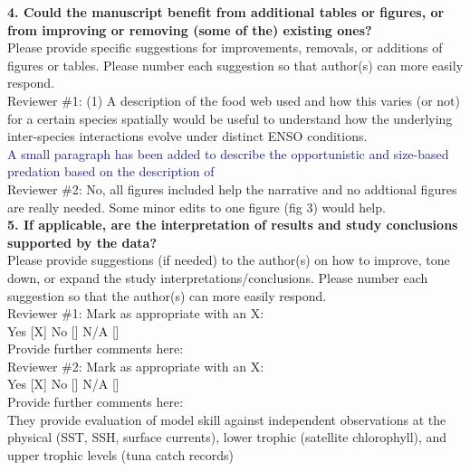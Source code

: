 \documentclass[12pt]{article}
\newcommand{\resp}[1]{\textcolor{MidnightBlue}{#1}}
\begin{document}
\textbf{4. Could the manuscript benefit from additional tables or figures, or from improving or removing (some of the) existing ones?} \\

Please provide specific suggestions for improvements, removals, or additions of figures or tables. Please number each suggestion so that author(s) can more easily respond.\\

Reviewer \#1: (1) A description of the food web used and how this varies (or not) for a certain species spatially would be useful to understand how the underlying inter-species interactions evolve under distinct ENSO conditions.\\

\resp{A small paragraph has been added to describe the opportunistic and size-based predation based on the
description of \cite{mauryIndividualsPopulationsCommunities2013}} \\


Reviewer \#2: No, all figures included help the narrative and no addtional figures are really needed. Some minor edits to one figure (fig 3) would help.\\

\textbf{5. If applicable, are the interpretation of results and study conclusions supported by the data?}\\

Please provide suggestions (if needed) to the author(s) on how to improve, tone down, or expand the study interpretations/conclusions. Please number each suggestion so that the author(s) can more easily respond.\\

Reviewer \#1: Mark as appropriate with an X:\\
Yes [X] No [] N/A []\\
Provide further comments here:\\

Reviewer \#2: Mark as appropriate with an X:\\
Yes [X] No [] N/A []\\

Provide further comments here:\\ 

They provide evaluation of model skill against independent observations at the physical (SST, SSH, surface currents), lower trophic (satellite chlorophyll), and upper trophic levels (tuna catch records) \\
\end{document}
